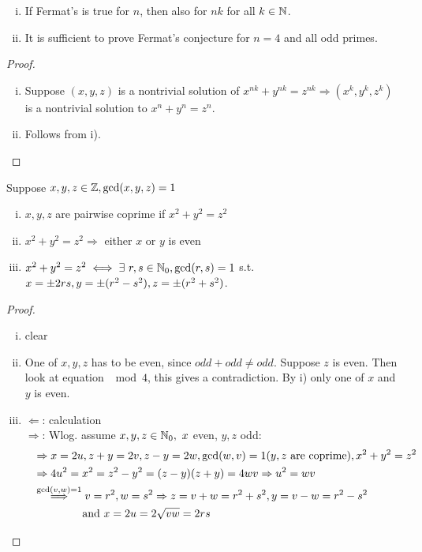 \begin{Bem}
\begin{enumerate}[i)]
\item If Fermat's is true for $n$, then also for $nk$ for all $k \in \mathbb{N}$.
\item It is sufficient to prove Fermat's conjecture for $n=4$ and all odd primes.
\end{enumerate}
\end{Bem}
\begin{proof}
\begin{enumerate}[i)]
\item Suppose $(x,y,z)$ is a nontrivial solution of $x^{nk}+y^{nk}=z^{nk} \Rightarrow (x^k,y^k,z^k)$ is a nontrivial solution to $x^n+y^n=z^n$.
\item Follows from i).
\end{enumerate}
\end{proof}

\begin{Prop}[$n=2$]
Suppose $x,y,z \in \mathbb{Z}, \gcd(x,y,z)=1$
\begin{enumerate}[i)]
\item $x,y,z$ are pairwise coprime if $x^2+y^2=z^2$
\item $x^2+y^2=z^2 \Rightarrow$ either $x$ or $y$ is even
\item $x^2+y^2=z^2 \iff \exists \ r,s \in \mathbb{N}_0, \gcd(r,s)=1$ s.t. $x=\pm 2rs, y= \pm (r^2-s^2), \linebreak
z = \pm(r^2+s^2)$.
\end{enumerate}
\end{Prop}
\begin{proof}
\begin{enumerate}[i)]
\item clear \checkmark
\item One of $x,y,z$ has to be even, since $odd+odd \neq odd$. Suppose $z$ is even. Then look at equation $\mod 4$, this gives a contradiction. By i) only one of $x$ and $y$ is even.
\item \glqq $\Leftarrow$\grqq: calculation\\
\glqq $\Rightarrow$\grqq: Wlog. assume $x,y,z \in \mathbb{N}_0,\ x$ even, $y,z$ odd:
\begin{align*}
\ \ &\Rightarrow x=2u, z+y=2v, z-y=2w, \gcd(w,v)=1 (y,z \text{ are coprime}) , x^2+y^2=z^2\\
&\Rightarrow 4u^2=x^2=z^2-y^2=(z-y)(z+y)=4wv \Rightarrow u^2=wv\\
&\stackrel{\gcd(v,w)=1}{\Longrightarrow} v=r^2, w=s^2 \Rightarrow z=v+w=r^2+s^2, y=v-w=r^2-s^2\\
&\hphantom{\stackrel{\gcd(v,w)=1}{\Longrightarrow}} \text{ and } x=2u=2\sqrt{vw}=2rs
\end{align*} 
\end{enumerate}
\end{proof}

